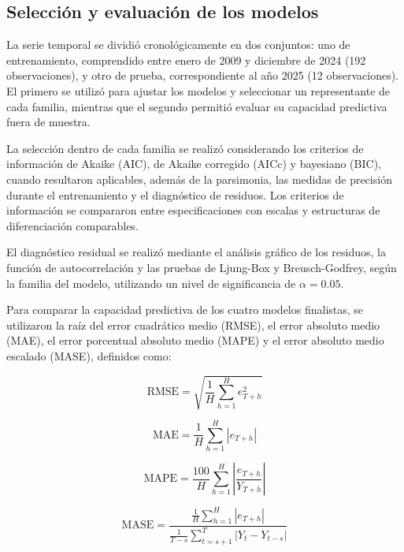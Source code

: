 \documentclass[12pt]{article}
\begin{document}
\subsection{Selección y evaluación de los modelos}

La serie temporal se dividió cronológicamente en dos 
conjuntos: uno de entrenamiento, comprendido entre enero 
de 2009 y diciembre de 2024 (192 observaciones), y otro 
de prueba, correspondiente al año 2025 (12 observaciones). 
El primero se utilizó para ajustar los modelos y 
seleccionar un representante de cada familia, mientras 
que el segundo permitió evaluar su capacidad predictiva 
fuera de muestra.

La selección dentro de cada familia se realizó considerando 
los criterios de información de Akaike (AIC), de Akaike 
corregido (AICc) y bayesiano (BIC), cuando resultaron 
aplicables, además de la parsimonia, las medidas de 
precisión durante el entrenamiento y el diagnóstico 
de residuos. Los criterios de información se compararon 
entre especificaciones con escalas y estructuras de 
diferenciación comparables.

El diagnóstico residual se realizó mediante el análisis 
gráfico de los residuos, la función de autocorrelación 
y las pruebas de Ljung-Box y Breusch-Godfrey, según 
la familia del modelo, utilizando un nivel de 
significancia de $\alpha=0.05$.

Para comparar la capacidad predictiva de los cuatro 
modelos finalistas, se utilizaron la raíz del error 
cuadrático medio (RMSE), el error absoluto medio (MAE), 
el error porcentual absoluto medio (MAPE) y el error 
absoluto medio escalado (MASE), definidos como:

\begin{equation}
\mathrm{RMSE}=\sqrt{\frac{1}{H}
\sum_{h=1}^{H}e_{T+h}^{2}}
\label{eq:rmse}
\end{equation}

\begin{equation}
\mathrm{MAE}=\frac{1}{H}
\sum_{h=1}^{H}|e_{T+h}|
\label{eq:mae}
\end{equation}

\begin{equation}
\mathrm{MAPE}=\frac{100}{H}
\sum_{h=1}^{H}
\left|\frac{e_{T+h}}{Y_{T+h}}\right|
\label{eq:mape}
\end{equation}

\begin{equation}
\mathrm{MASE}=
\frac{
\frac{1}{H}\sum_{h=1}^{H}|e_{T+h}|
}{
\frac{1}{T-s}\sum_{t=s+1}^{T}|Y_t-Y_{t-s}|
}
\label{eq:mase}
\end{equation}
\end{document}

